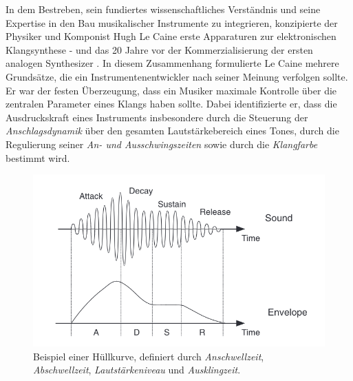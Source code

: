 \documentclass[
  a4paper,  %
  twoside,  %
  bibliography=totoc,
  headsepline,
  cleardoublepage=empty,
  parskip=half,
  draft=false
]{scrbook}
\begin{document}
In dem Bestreben, sein fundiertes wissenschaftliches Verständnis und seine Expertise in den Bau musikalischer Instrumente zu integrieren, konzipierte der Physiker und Komponist Hugh Le Caine erste Apparaturen zur elektronischen Klangsynthese - und das 20 Jahre vor der Kommerzialisierung der ersten analogen Synthesizer \cite{young_gale_hugh_2013}. In diesem Zusammenhang formulierte Le Caine mehrere Grundsätze, die ein Instrumentenentwickler nach seiner Meinung verfolgen sollte. Er war der festen Überzeugung, dass ein Musiker maximale Kontrolle über die zentralen Parameter eines Klangs haben sollte. Dabei identifizierte er, dass die Ausdruckskraft eines Instruments insbesondere durch die Steuerung der \emph{Anschlagsdynamik} über den gesamten Lautstärkebereich eines Tones, durch die Regulierung seiner \emph{An- und Ausschwingszeiten} sowie durch die \emph{Klangfarbe} bestimmt wird. \cite{ruschkowski_elektronische_2019}

\begin{figure}[h]
  \centering
  \includegraphics[width=.7\textwidth]{graphics/ADSR.png}
  \caption[Hüllkurve]{Beispiel einer Hüllkurve, definiert durch \emph{Anschwellzeit}, \emph{Abschwellzeit}, \emph{Lautstärkeniveau} und \emph{Ausklingzeit}. \cite{russ_sound_2009}}
  \label{fig:adsr}
\end{figure}
\end{document}
